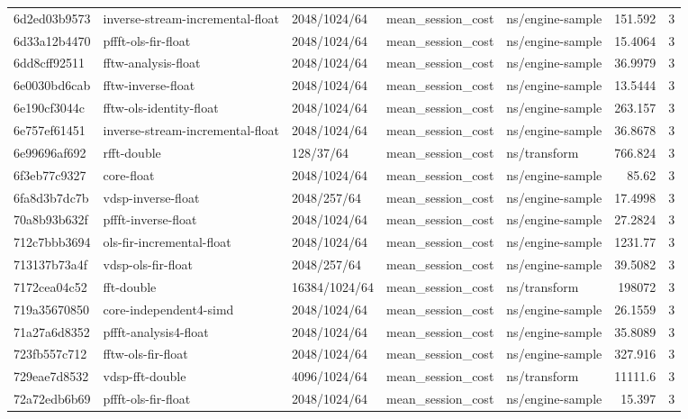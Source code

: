 \begin{longtable}{lllllrr}
6d2ed03b9573 & inverse-stream-incremental-float & 2048/1024/64 & mean\_session\_cost & ns/engine-sample & 151.592 & 3 \\
6d33a12b4470 & pffft-ols-fir-float & 2048/1024/64 & mean\_session\_cost & ns/engine-sample & 15.4064 & 3 \\
6dd8cff92511 & fftw-analysis-float & 2048/1024/64 & mean\_session\_cost & ns/engine-sample & 36.9979 & 3 \\
6e0030bd6cab & fftw-inverse-float & 2048/1024/64 & mean\_session\_cost & ns/engine-sample & 13.5444 & 3 \\
6e190cf3044c & fftw-ols-identity-float & 2048/1024/64 & mean\_session\_cost & ns/engine-sample & 263.157 & 3 \\
6e757ef61451 & inverse-stream-incremental-float & 2048/1024/64 & mean\_session\_cost & ns/engine-sample & 36.8678 & 3 \\
6e99696af692 & rfft-double & 128/37/64 & mean\_session\_cost & ns/transform & 766.824 & 3 \\
6f3eb77c9327 & core-float & 2048/1024/64 & mean\_session\_cost & ns/engine-sample & 85.62 & 3 \\
6fa8d3b7dc7b & vdsp-inverse-float & 2048/257/64 & mean\_session\_cost & ns/engine-sample & 17.4998 & 3 \\
70a8b93b632f & pffft-inverse-float & 2048/1024/64 & mean\_session\_cost & ns/engine-sample & 27.2824 & 3 \\
712c7bbb3694 & ols-fir-incremental-float & 2048/1024/64 & mean\_session\_cost & ns/engine-sample & 1231.77 & 3 \\
713137b73a4f & vdsp-ols-fir-float & 2048/257/64 & mean\_session\_cost & ns/engine-sample & 39.5082 & 3 \\
7172cea04c52 & fft-double & 16384/1024/64 & mean\_session\_cost & ns/transform & 198072 & 3 \\
719a35670850 & core-independent4-simd & 2048/1024/64 & mean\_session\_cost & ns/engine-sample & 26.1559 & 3 \\
71a27a6d8352 & pffft-analysis4-float & 2048/1024/64 & mean\_session\_cost & ns/engine-sample & 35.8089 & 3 \\
723fb557c712 & fftw-ols-fir-float & 2048/1024/64 & mean\_session\_cost & ns/engine-sample & 327.916 & 3 \\
729eae7d8532 & vdsp-fft-double & 4096/1024/64 & mean\_session\_cost & ns/transform & 11111.6 & 3 \\
72a72edb6b69 & pffft-ols-fir-float & 2048/1024/64 & mean\_session\_cost & ns/engine-sample & 15.397 & 3 \\

\end{longtable}
